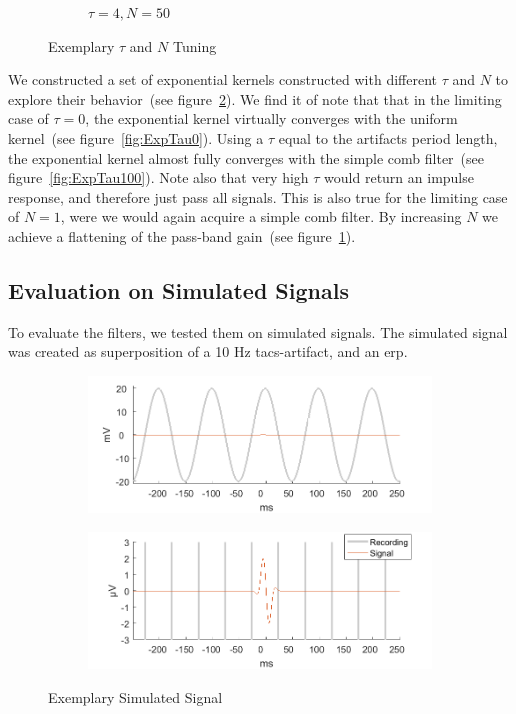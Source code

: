 \documentclass[a4paper]{article}
\newcommand{\figref}[1]{(see figure~\ref{#1})}
\begin{document}
\begin{figure}[hbtp]
\begin{subfigure}{.245\textwidth}
        \caption{$\tau= 4, N=50$}\label{fig:ExpNP50}
    \end{subfigure}
    \caption{Exemplary $\tau$ and $N$ Tuning}\label{fig:ExemplaryTuning}
\end{figure}

We constructed a set of exponential kernels constructed with different $\tau$ and $N$ to explore their behavior~\figref{fig:ExemplaryTuning}.
We find it of note that that in the limiting case of $\tau = 0$, the exponential kernel virtually converges with the uniform kernel~\figref{fig:ExpTau0}. Using a $\tau$ equal to the artifacts period length, the exponential kernel almost fully converges with the simple comb filter~\figref{fig:ExpTau100}.
Note also that very high $\tau$ would return an impulse response, and therefore just pass all signals.
This is also  true for the limiting case of $N = 1$, were we would again acquire a simple comb filter. By increasing $N$ we achieve a flattening of the pass-band gain~\figref{fig:ExpNP50}.

\subsection{Evaluation on Simulated Signals}\label{sec:EvaluationSimulated}

To evaluate the filters, we tested them on simulated signals. The simulated signal was created as superposition of a 10 Hz \gls{tacs}-artifact, and an \gls{erp}.

\begin{figure}[hbtp]
    \begin{subfigure}{.45\textwidth}
        \includegraphics[width=\textwidth]{./img/eva/sim_raw_1.png}
    \end{subfigure}
    \begin{subfigure}{.45\textwidth}
        \includegraphics[width=\textwidth]{./img/eva/sim_raw_2.png}
    \end{subfigure}
    \caption{Exemplary Simulated Signal}\label{fig:SimRaw}
\end{figure}
\end{document}
